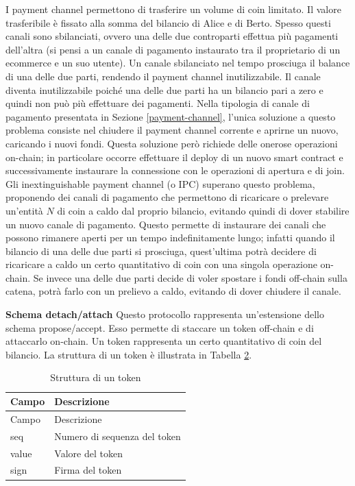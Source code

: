 \documentclass[12pt,italian,]{book}
\begin{document}
I payment channel permettono di trasferire un volume di coin limitato. Il valore trasferibile è fissato alla somma del bilancio di Alice e di Berto. Spesso questi canali sono sbilanciati, ovvero una delle due controparti effettua più pagamenti dell'altra (si pensi a un canale di pagamento instaurato tra il proprietario di un ecommerce e un suo utente). Un canale sbilanciato nel tempo prosciuga il balance di una delle due parti, rendendo il payment channel inutilizzabile. Il canale diventa inutilizzabile poiché una delle due parti ha un bilancio pari a zero e quindi non può più effettuare dei pagamenti. Nella tipologia di canale di pagamento presentata in Sezione \ref{payment-channel}, l'unica soluzione a questo problema consiste nel chiudere il payment channel corrente e aprirne un nuovo, caricando i nuovi fondi. Questa soluzione però richiede delle onerose operazioni on-chain; in particolare occorre effettuare il deploy di un nuovo smart contract e successivamente instaurare la connessione con le operazioni di apertura e di join. Gli inextinguishable payment channel (o IPC) superano questo problema, proponendo dei canali di pagamento che permettono di ricaricare o prelevare un'entità \(N\) di coin a caldo dal proprio bilancio, evitando quindi di dover stabilire un nuovo canale di pagamento. Questo permette di instaurare dei canali che possono rimanere aperti per un tempo indefinitamente lungo; infatti quando il bilancio di una delle due parti si prosciuga, quest'ultima potrà decidere di ricaricare a caldo un certo quantitativo di coin con una singola operazione on-chain. Se invece una delle due parti decide di voler spostare i fondi off-chain sulla catena, potrà farlo con un prelievo a caldo, evitando di dover chiudere il canale.

\textbf{\textbf{Schema detach/attach}} Questo protocollo rappresenta un'estensione dello schema propose/accept. Esso permette di staccare un token off-chain e di attaccarlo on-chain. Un token rappresenta un certo quantitativo di coin del bilancio. La struttura di un token è illustrata in Tabella \protect\hyperlink{struct_token}{2}.

\begin{longtable}[]{@{}ll@{}}
\caption{\protect\hypertarget{struct_token}{}{}Struttura di un token}\tabularnewline
\toprule
Campo & Descrizione\tabularnewline
\midrule
\endfirsthead
\toprule
Campo & Descrizione\tabularnewline
\midrule
\endhead
seq & Numero di sequenza del token\tabularnewline
value & Valore del token\tabularnewline
sign & Firma del token\tabularnewline
\bottomrule
\end{longtable}
\end{document}
